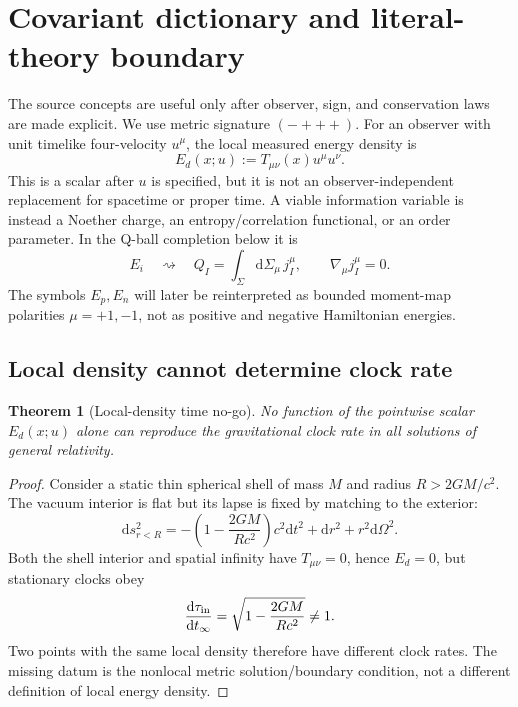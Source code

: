 \documentclass[11pt]{article}
\numberwithin{equation}{section}
\newcommand{\dd}{\mathrm d}
\newtheorem{theorem}{Theorem}[section]
\begin{document}
\section{Covariant dictionary and literal-theory boundary}

The source concepts are useful only after observer, sign, and conservation
laws are made explicit.  We use metric signature \((-+++ )\).  For an
observer with unit timelike four-velocity \(u^\mu\), the local measured energy
density is
\begin{equation}
 E_d(x;u):=T_{\mu\nu}(x)u^\mu u^\nu.
 \label{eq:Ed}
\end{equation}
This is a scalar after \(u\) is specified, but it is not an observer-independent
replacement for spacetime or proper time.  A viable information variable is
instead a Noether charge, an entropy/correlation functional, or an order
parameter.  In the Q-ball completion below it is
\begin{equation}
 E_i\quad\rightsquigarrow\quad Q_I=\int_\Sigma \dd\Sigma_\mu\,j_I^\mu,
 \qquad \nabla_\mu j_I^\mu=0.
 \label{eq:EiQ}
\end{equation}
The symbols \(E_p,E_n\) will later be reinterpreted as bounded moment-map
polarities \(\mu=+1,-1\), not as positive and negative Hamiltonian energies.

\subsection{Local density cannot determine clock rate}

\begin{theorem}[Local-density time no-go]
No function of the pointwise scalar \(E_d(x;u)\) alone can reproduce the
gravitational clock rate in all solutions of general relativity.
\end{theorem}

\begin{proof}
Consider a static thin spherical shell of mass \(M\) and radius \(R>2GM/c^2\).
The vacuum interior is flat but its lapse is fixed by matching to the exterior:
\begin{equation}
 \dd s^2_{r<R}
 =-\left(1-\frac{2GM}{Rc^2}\right)c^2\dd t^2
 +\dd r^2+r^2\dd\Omega^2.
 \label{eq:shellmetric}
\end{equation}
Both the shell interior and spatial infinity have \(T_{\mu\nu}=0\), hence
\(E_d=0\), but stationary clocks obey
\begin{equation}
 \frac{\dd\tau_{\rm in}}{\dd t_\infty}
 =\sqrt{1-\frac{2GM}{Rc^2}}\ne1.
 \label{eq:shellclock}
\end{equation}
Two points with the same local density therefore have different clock rates.
The missing datum is the nonlocal metric solution/boundary condition, not a
different definition of local energy density.
\end{proof}
\end{document}
